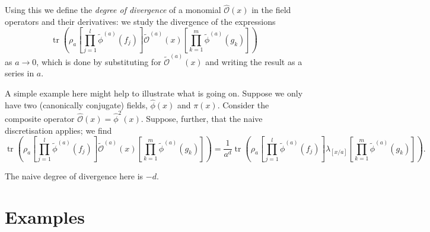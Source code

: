 \documentclass[prl,twocolumn,lengthcheck,superscriptaddress]{revtex4-1}
\newcommand{\tr}{\operatorname{tr}}
\theoremstyle{definition}
\theoremstyle{remark}
\begin{document}
Using this we define the \emph{degree of divergence} of a monomial $\widehat{\mathcal{O}}(x)$ in the field operators and their derivatives: we study 
the divergence of the expressions 
\begin{equation}
	\tr\left(\rho_a \left[\prod_{j=1}^l\widetilde{\phi}^{(a)}(f_j)\right] \widetilde{\mathcal{O}}^{(a)}(x) \left[\prod_{k=1}^m\widetilde{\phi}^{(a)}(g_k)\right]\right)
\end{equation}
as $a\rightarrow 0$, which is done by substituting for $\widetilde{\mathcal{O}}^{(a)}(x)$ and writing the result as a series in $a$.

A simple example here might help to illustrate what is going on. Suppose we only have two (canonically conjugate) fields, $\widehat{\phi}(x)$ and $\pi(x)$. Consider the composite operator $\widehat{\mathcal{O}}(x) = \widehat{\phi}^2(x)$. Suppose, further, that the naive discretisation applies; we find
\begin{equation}
	\tr\left(\rho_a \left[\prod_{j=1}^l\widetilde{\phi}^{(a)}(f_j)\right] \widetilde{\mathcal{O}}^{(a)}(x) \left[\prod_{k=1}^m\widetilde{\phi}^{(a)}(g_k)\right]\right) = \frac{1}{a^d} \tr\left(\rho_a \left[\prod_{j=1}^l\widetilde{\phi}^{(a)}(f_j)\right] \lambda_{[x/a]} \left[\prod_{k=1}^m\widetilde{\phi}^{(a)}(g_k)\right]\right).
\end{equation}
 
The naive degree of divergence here is $-d$.


\section{Examples}
\end{document}

